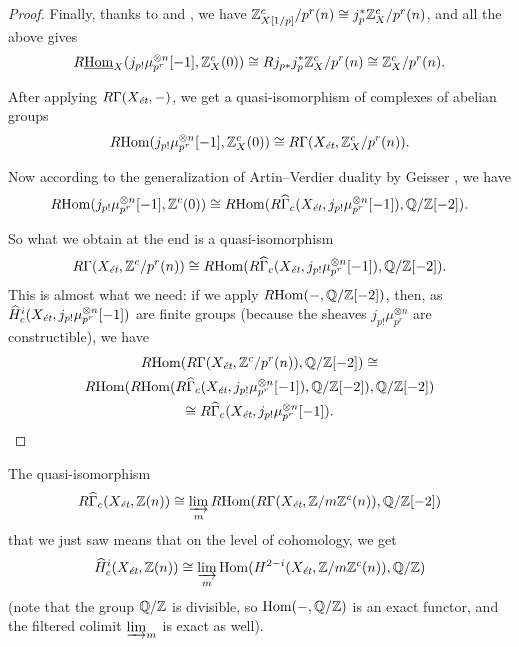 \begin{proof}
  Finally, thanks to \cite[Theorem 7.2 (a)]{Geisser-10} and
  \cite[Proposition 2.3]{Geisser-10}, we have
  $\mathbb{Z}^c_{X [1/p]}/p^r (n) \cong j_p^*\mathbb{Z}^c_X/p^r (n)$, and all the above gives
  \begin{equation}
    R\underline{\operatorname{Hom}}_X (j_{p!} \mu_{p^r}^{\otimes n} [-1], \mathbb{Z}^c_X (0)) \cong
    R j_{p*} j_p^* \mathbb{Z}^c_X/p^r (n) \cong \mathbb{Z}^c_X/p^r (n).
  \end{equation}

  After applying $R\Gamma (X_\text{\it ét}, -)$, we get a quasi-isomorphism of
  complexes of abelian groups
  \begin{equation}
    R\!\operatorname{Hom} (j_{p!} \mu_{p^r}^{\otimes n} [-1], \mathbb{Z}^c_X (0)) \cong
    R\Gamma (X_\text{\it ét}, \mathbb{Z}^c_X/p^r (n)).
  \end{equation}

  Now according to the generalization of Artin--Verdier duality by Geisser
  \cite[Theorem 7.8]{Geisser-10}, we have
  \begin{equation}
    R\!\operatorname{Hom} (j_{p !} \mu_{p^r}^{\otimes n} [-1], \mathbb{Z}^c (0)) \cong
    R\!\operatorname{Hom} (R\widehat{\Gamma}_c (X_\text{\it ét}, j_{p !} \mu_{p^r}^{\otimes n} [-1]), \mathbb{Q}/\mathbb{Z} [-2]).
  \end{equation}

  So what we obtain at the end is a quasi-isomorphism
  \[ R\Gamma (X_\text{\it ét}, \mathbb{Z}^c/p^r (n)) \cong
    R\!\operatorname{Hom} (R\widehat{\Gamma}_c (X_\text{\it ét}, j_{p !} \mu_{p^r}^{\otimes n} [-1]), \mathbb{Q}/\mathbb{Z} [-2]). \]
  This is almost what we need: if we apply $R\!\operatorname{Hom} (-,\mathbb{Q}/\mathbb{Z} [-2])$, then, as
  $\widehat{H}^i_c (X_\text{\it ét}, j_{p!} \mu_{p^r}^{\otimes n} [-1])$ are
  finite groups (because the sheaves $j_{p!} \mu_{p^r}^{\otimes n}$ are
  constructible), we have
  \begin{multline*}
    R\!\operatorname{Hom} (R\Gamma (X_\text{\it ét}, \mathbb{Z}^c/p^r (n)), \mathbb{Q}/\mathbb{Z}[-2]) \cong\\
    R\!\operatorname{Hom} (R\!\operatorname{Hom} (R\widehat{\Gamma}_c (X_\text{\it ét}, j_{p !} \mu_{p^r}^{\otimes n} [-1]), \mathbb{Q}/\mathbb{Z}[-2]), \mathbb{Q}/\mathbb{Z}[-2]) \\
    \cong R\widehat{\Gamma}_c (X_\text{\it ét}, j_{p !} \mu_{p^r}^{\otimes n} [-1]).
  \end{multline*}
\end{proof}

The quasi-isomorphism
\[ R\widehat{\Gamma}_c (X_\text{\it ét}, \mathbb{Z} (n)) \cong
  \varinjlim_m R\!\operatorname{Hom} (R\Gamma (X_\text{\it ét}, \mathbb{Z}/m\mathbb{Z}^c (n)), \mathbb{Q}/\mathbb{Z} [-2]) \]
that we just saw means that on the level of cohomology, we get
\[ \widehat{H}^i_c (X_\text{\it ét}, \mathbb{Z} (n)) \cong
  \varinjlim_m \operatorname{Hom} (H^{2-i} (X_\text{\it ét}, \mathbb{Z}/m\mathbb{Z}^c (n)), \mathbb{Q}/\mathbb{Z}) \]
(note that the group $\mathbb{Q}/\mathbb{Z}$ is divisible, so $\operatorname{Hom} (-,\mathbb{Q}/\mathbb{Z})$ is an exact
functor, and the filtered colimit $\varinjlim_m$ is exact as well).

